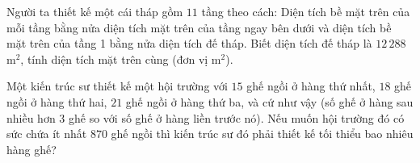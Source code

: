 \begin{bt}%
	Người ta thiết kế một cái tháp gồm $11$ tầng theo cách: Diện tích bề mặt trên của mỗi tầng bằng nửa diện tích mặt trên của tầng ngay bên dưới và diện tích bề mặt trên của tầng 1 bằng nửa diện tích đế tháp. Biết diện tích đế tháp là $12\,288$ m$^2$, tính diện tích mặt trên cùng (đơn vị m$^2$).
	
\end{bt}

\begin{bt}%

Một kiến trúc sư thiết kế một hội trường với $15$ ghế ngồi ở hàng thứ nhất, $18$ ghế ngồi ở hàng thứ hai, $21$ ghế ngồi ở hàng thứ ba, và cứ như vậy (số ghế ở hàng sau nhiều hơn $3$ ghế so với số ghế ở hàng liền trước nó). Nếu muốn hội trường đó có sức chứa ít nhất $870$ ghế ngồi thì kiến trúc sư đó phải thiết kế tối thiểu bao nhiêu hàng ghế?
\end{bt}

